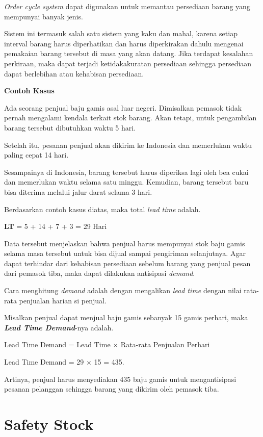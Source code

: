 \begin{enumerate}
	\textit{Order cycle system} dapat digunakan untuk memantau persediaan barang yang mempunyai banyak jenis.

	Sistem ini termasuk salah satu sistem yang kaku dan mahal, karena setiap interval barang harus diperhatikan dan harus diperkirakan dahulu mengenai pemakaian barang tersebut di masa yang akan datang. Jika terdapat kesalahan perkiraan, maka dapat terjadi ketidakakuratan persediaan sehingga persediaan dapat berlebihan atau kehabisan persediaan.
\end{enumerate}

\textbf{Contoh Kasus}

Ada seorang penjual baju gamis asal luar negeri. Dimisalkan pemasok tidak pernah mengalami kendala terkait stok barang. Akan tetapi, untuk pengambilan barang tersebut dibutuhkan waktu 5 hari.

Setelah itu, pesanan penjual akan dikirim ke Indonesia dan memerlukan waktu paling cepat 14 hari.

Sesampainya di Indonesia, barang tersebut harus diperiksa lagi oleh bea cukai dan memerlukan waktu selama satu minggu. Kemudian, barang tersebut baru bisa diterima melalui jalur darat selama 3 hari.

Berdasarkan contoh kasus diatas, maka total \textit{lead time} adalah.

\textbf{LT} = 5 + 14 + 7 + 3 = 29 Hari

Data tersebut menjelaskan bahwa penjual harus mempunyai stok baju gamis selama masa tersebut untuk bisa dijual sampai pengiriman selanjutnya. Agar dapat terhindar dari kehabisan persediaan sebelum barang yang penjual pesan dari pemasok tiba, maka dapat dilakukan antisipasi \textit{demand}.

Cara menghitung \textit{demand} adalah dengan mengalikan \textit{lead time} dengan nilai rata-rata penjualan harian si penjual.

Misalkan penjual dapat menjual baju gamis sebanyak 15 gamis perhari, maka \textbf{\textit{Lead Time Demand}}-nya adalah.

Lead Time Demand = Lead Time $\times$ Rata-rata Penjualan Perhari

Lead Time Demand = 29 $\times$ 15 = 435.

Artinya, penjual harus menyediakan 435 baju gamis untuk mengantisipasi pesanan pelanggan sehingga barang yang dikirim oleh pemasok tiba.

\section{Safety Stock}

